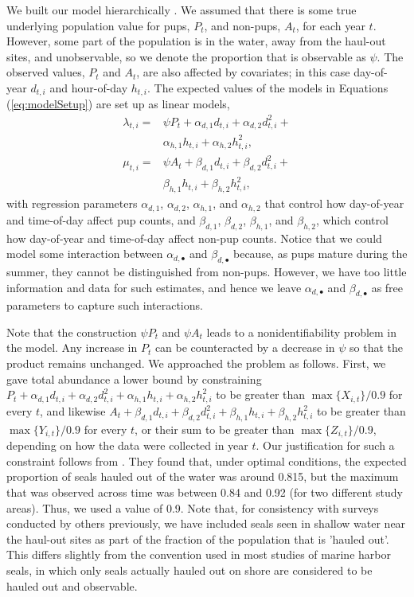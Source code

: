 \documentclass[]{risa}\usepackage[]{graphicx}\usepackage[]{color}
\begin{document}
We built our model hierarchically \citep{Cres:Cald:Clar:VerH:acco:2009}.  We assumed that there is some true underlying population value for pups, $P_t$, and non-pups, $A_t$, for each year $t$. However, some part of the population is in the water, away from the haul-out sites, and unobservable, so we denote the proportion that is observable as $\psi$. The observed values, $P_t$ and $A_t$, are also affected by covariates; in this case day-of-year $d_{t,i}$ and hour-of-day $h_{t,i}$. The expected values of the models in Equations (\ref{eq:modelSetup}) are set up as linear models,
%
\begin{align}  \label{eq:linModels}
	\lambda_{t,i} =& \psi P_t + \alpha_{d,1}d_{t,i} + \alpha_{d,2}d^2_{t,i} + \nonumber \\
		& \alpha_{h,1}h_{t,i} + \alpha_{h,2}h^2_{t,i}, \nonumber \\
	\mu_{t,i} =& \psi A_t + \beta_{d,1}d_{t,i} + \beta_{d,2}d^2_{t,i} + \nonumber \\
		& \beta_{h,1}h_{t,i} + \beta_{h,2}h^2_{t,i}, 
\end{align}
%
with regression parameters $\alpha_{d,1}$, $\alpha_{d,2}$, $\alpha_{h,1}$, and $\alpha_{h,2}$ that control how day-of-year and time-of-day affect pup counts, and $\beta_{d,1}$, $\beta_{d,2}$, $\beta_{h,1}$, and $\beta_{h,2}$, which control how day-of-year and time-of-day affect non-pup counts.  Notice that we could model some interaction between $\alpha_{d,\bullet}$ and $\beta_{d,\bullet}$ because, as pups mature during the summer, they cannot be distinguished from non-pups.  However, we have too little information and data for such estimates, and hence we leave $\alpha_{d,\bullet}$ and $\beta_{d,\bullet}$ as free parameters to capture such interactions.

Note that the construction $\psi P_t$ and $\psi A_t$ leads to a nonidentifiability problem in the model. Any increase in $P_t$ can be counteracted by a decrease in $\psi$ so that the product remains unchanged.  We approached the problem as follows. First, we gave total abundance a lower bound by constraining $P_t + \alpha_{d,1}d_{t,i} + \alpha_{d,2}d^2_{t,i} + \alpha_{h,1}h_{t,i} + \alpha_{h,2}h^2_{t,i}$ to be greater than $\max\{X_{i,t}\}/0.9$ for every $t$, and likewise $A_t + \beta_{d,1}d_{t,i} + \beta_{d,2}d^2_{t,i} + \beta_{h,1}h_{t,i} + \beta_{h,2}h^2_{t,i}$ to be greater than $\max\{Y_{i,t}\}/0.9$ for every $t$, or their sum to be greater than $\max\{Z_{i,t}\}/0.9$, depending on how the data were collected in year $t$.   Our justification for such a constraint follows from \citet{Simp:With:Cesa:Bove:stab:2003}. They found that, under optimal conditions, the expected proportion of seals hauled out of the water was around 0.815, but the maximum that was observed across time was between 0.84 and 0.92 (for two different study areas).  Thus, we used a value of 0.9.  Note that, for consistency with  surveys conducted by others previously, we have included seals seen in shallow water near the haul-out sites as part of the fraction of the population that is 'hauled out'. This differs slightly from the convention used in most studies of marine harbor seals, in which only seals actually hauled out on shore are considered to be hauled out and observable.
\end{document}
